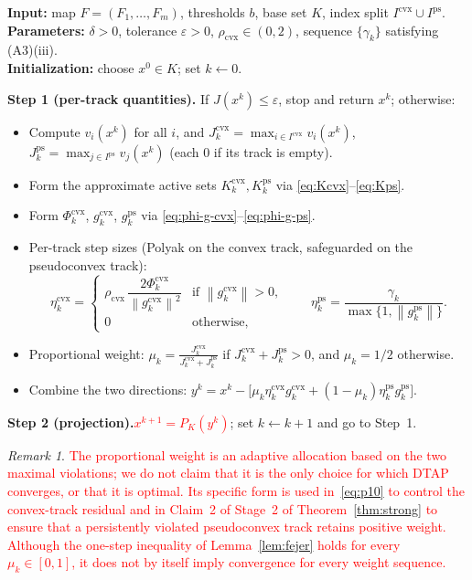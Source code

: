 \documentclass[]{interact}
\theoremstyle{plain}
\theoremstyle{definition}
\theoremstyle{remark}
\newtheorem{remark}{Remark}
\newcommand{\algstep}[1]{\smallskip\noindent\textbf{#1}}
\newcommand{\norm}[1]{\left\lVert #1 \right\rVert}
\newcommand{\cvx}{\mathrm{cvx}}
\newcommand{\ps}{\mathrm{ps}}
\begin{document}
\begin{algorithm}[H]
\caption{Dual-Track Adaptive Projection (DTAP) for the normal-box NSFP
\eqref{eq:nsfp-box}.}
\label{alg:dtap}
\small
\noindent\textbf{Input:} map $F=(F_1,\dots,F_m)$, thresholds $b$, base set $K$, index
split $I^{\cvx}\cup I^{\ps}$.\\
\textbf{Parameters:} $\delta>0$, tolerance $\varepsilon>0$, $\rho_{\cvx}\in(0,2)$,
sequence $\{\gamma_k\}$ satisfying (A3)(iii).\\
\textbf{Initialization:} choose $x^0\in K$; set $k\leftarrow 0$.

\algstep{Step 1 (per-track quantities).} If $J(x^k)\le\varepsilon$, stop and return $x^k$; otherwise:
\begin{itemize}[leftmargin=1.6em,itemsep=1pt,topsep=2pt]
\item[(1a)] Compute $v_i(x^k)$ for all $i$, and $J^{\cvx}_k=\max_{i\in I^{\cvx}}v_i(x^k)$,
$J^{\ps}_k=\max_{j\in I^{\ps}}v_j(x^k)$ (each $0$ if its track is empty).
\item[(1b)] Form the approximate active sets $K^{\cvx}_k,K^{\ps}_k$ via
\eqref{eq:Kcvx}--\eqref{eq:Kps}.
\item[(1c)] Form $\Phi^{\cvx}_k$, $g^{\cvx}_k$, $g^{\ps}_k$ via
\eqref{eq:phi-g-cvx}--\eqref{eq:phi-g-ps}.
\item[(1d)] Per-track step sizes (Polyak on the convex track, safeguarded on the
pseudoconvex track):
\[
\eta^{\cvx}_k=\begin{cases}\rho_{\cvx}\,\dfrac{2\Phi^{\cvx}_k}{\norm{g^{\cvx}_k}^2} & \text{if }\norm{g^{\cvx}_k}>0,\\ 0 & \text{otherwise,}\end{cases}
\qquad
\eta^{\ps}_k=\frac{\gamma_k}{\max\{1,\norm{g^{\ps}_k}\}} .
\]
\item[(1e)] Proportional weight:
$\displaystyle \mu_k=\frac{J^{\cvx}_k}{J^{\cvx}_k+J^{\ps}_k}$ if
$J^{\cvx}_k+J^{\ps}_k>0$, and $\mu_k=1/2$ otherwise.
\item[(1f)] Combine the two directions:
$\displaystyle y^k=x^k-\bigl[\mu_k\eta^{\cvx}_k g^{\cvx}_k+(1-\mu_k)\eta^{\ps}_k g^{\ps}_k\bigr].$
\end{itemize}
\algstep{Step 2 (projection).}\quad \leavevmode\textcolor{red}{$x^{k+1}=P_K(y^k)$}; set $k\leftarrow k+1$ and go to Step~1.
\end{algorithm}

\begin{remark}\label{rem:weight-scope}
\leavevmode\textcolor{red}{The proportional weight is an adaptive allocation based on the two maximal violations;
we do not claim that it is the only choice for which DTAP converges, or that it is optimal.
Its specific form is used in~\eqref{eq:p10} to control the convex-track residual and in
Claim~2 of Stage~2 of Theorem~\ref{thm:strong} to ensure that a persistently violated
pseudoconvex track retains positive weight. Although the one-step inequality of Lemma~\ref{lem:fejer} holds
for every $\mu_k\in[0,1]$, it does not by itself imply convergence for every weight sequence.}
\end{remark}
\end{document}
